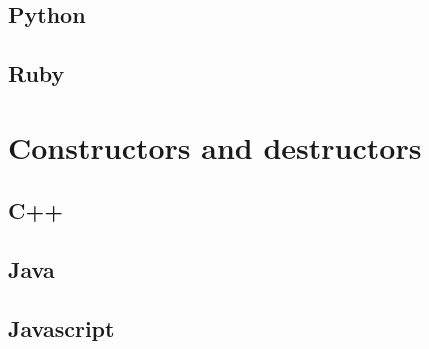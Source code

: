 \documentclass{KodeBook}
\begin{document}


\subsection{Python}



\subsection{Ruby}




\section{Constructors and destructors}

\subsection{C++}







\subsection{Java}







\subsection{Javascript}


\end{document}
